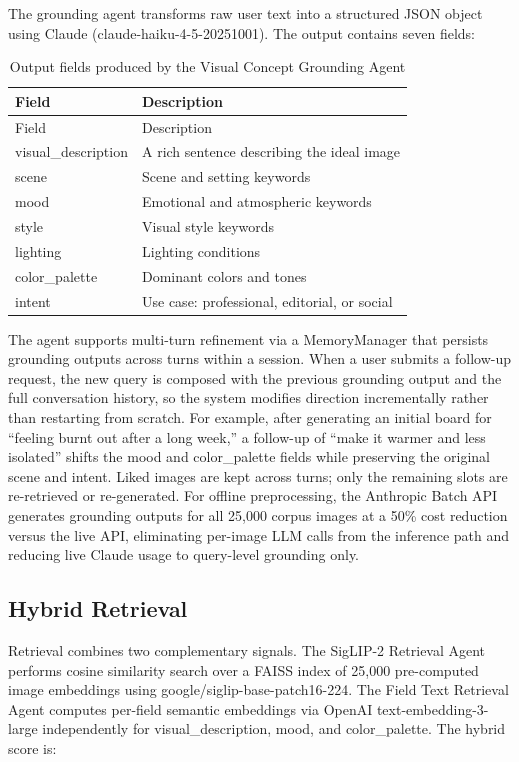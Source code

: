 \documentclass[
  11pt,
]{article}
\begin{document}
The grounding agent transforms raw user text into a structured JSON
object using Claude (claude-haiku-4-5-20251001). The output contains
seven fields:

\begin{longtable}[]{@{}ll@{}}
\caption{Output fields produced by the Visual Concept Grounding
Agent}\label{tbl-grounding-fields}\tabularnewline
\toprule\noalign{}
Field & Description \\
\midrule\noalign{}
\endfirsthead
\toprule\noalign{}
Field & Description \\
\midrule\noalign{}
\endhead
\bottomrule\noalign{}
\endlastfoot
visual\_description & A rich sentence describing the ideal image \\
scene & Scene and setting keywords \\
mood & Emotional and atmospheric keywords \\
style & Visual style keywords \\
lighting & Lighting conditions \\
color\_palette & Dominant colors and tones \\
intent & Use case: professional, editorial, or social \\
\end{longtable}

The agent supports multi-turn refinement via a MemoryManager that
persists grounding outputs across turns within a session. When a user
submits a follow-up request, the new query is composed with the previous
grounding output and the full conversation history, so the system
modifies direction incrementally rather than restarting from scratch.
For example, after generating an initial board for ``feeling burnt out
after a long week,'' a follow-up of ``make it warmer and less isolated''
shifts the mood and color\_palette fields while preserving the original
scene and intent. Liked images are kept across turns; only the remaining
slots are re-retrieved or re-generated. For offline preprocessing, the
Anthropic Batch API generates grounding outputs for all 25,000 corpus
images at a 50\% cost reduction versus the live API, eliminating
per-image LLM calls from the inference path and reducing live Claude
usage to query-level grounding only.

\subsection{Hybrid Retrieval}\label{hybrid-retrieval}

Retrieval combines two complementary signals. The SigLIP-2 Retrieval
Agent performs cosine similarity search over a FAISS index of 25,000
pre-computed image embeddings using google/siglip-base-patch16-224. The
Field Text Retrieval Agent computes per-field semantic embeddings via
OpenAI text-embedding-3-large independently for visual\_description,
mood, and color\_palette. The hybrid score is:
\end{document}
